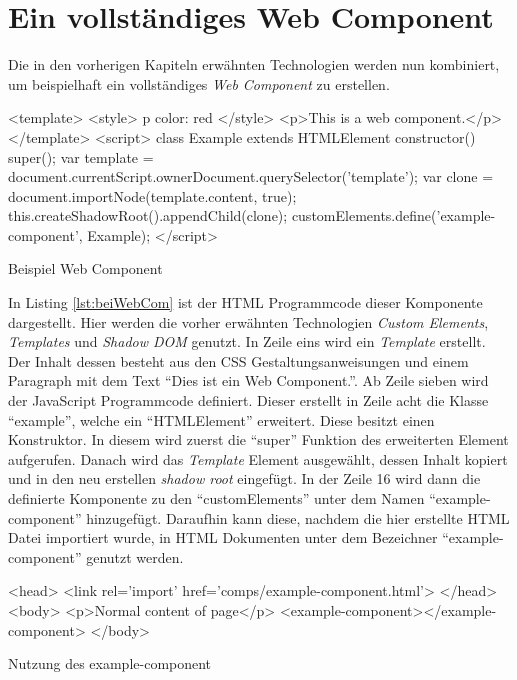 \documentclass[12pt, paper=a4, bibtotoc, toc=listof, headsepline=true]{scrreprt}
\begin{document}
		\section{Ein vollständiges Web Component}
		Die in den vorherigen Kapiteln erwähnten Technologien werden nun kombiniert, um beispielhaft ein vollständiges \emph{Web Component} zu erstellen. 		\begin{listing}
			\begin{HTMLcode*}{}
<template>
   <style>
      p {color: red}
   </style>
   <p>This is a web component.</p>
</template>
<script>
   class Example extends HTMLElement {
      constructor() {
         super();
         var template = document.currentScript.ownerDocument.querySelector('template');
         var clone = document.importNode(template.content, true);
         this.createShadowRoot().appendChild(clone);
      }
   }
customElements.define('example-component', Example);
</script>
			\end{HTMLcode*}
			\caption{Beispiel Web Component}
			\label{lst:beiWebCom}
		\end{listing}
		In Listing \ref{lst:beiWebCom} ist der \ac{HTML} Programmcode dieser Komponente dargestellt. Hier werden die vorher erwähnten Technologien \emph{Custom Elements}, \emph{Templates} und \emph{Shadow DOM} genutzt. In Zeile eins wird ein \emph{Template} erstellt. Der Inhalt dessen besteht aus den \ac{CSS} Gestaltungsanweisungen und einem Paragraph mit dem Text \enquote{Dies ist ein Web Component.}. Ab Zeile sieben wird der JavaScript Programmcode definiert. Dieser erstellt in Zeile acht die Klasse \enquote{example}, welche ein \enquote{HTMLElement} erweitert. Diese besitzt einen Konstruktor. In diesem wird zuerst die \enquote{super} Funktion des erweiterten Element aufgerufen. Danach wird das \emph{Template} Element ausgewählt, dessen Inhalt kopiert und in den neu erstellen \emph{shadow root} eingefügt. In der Zeile 16 wird dann die definierte Komponente zu den \enquote{customElements} unter dem Namen \enquote{example-component} hinzugefügt. Daraufhin kann diese, nachdem die hier erstellte \ac{HTML} Datei importiert wurde, in \ac{HTML} Dokumenten unter dem Bezeichner \enquote{example-component} genutzt werden.
\begin{listing}[H]
	\begin{HTMLcode*}{}
<head>
   <link rel='import' href='comps/example-component.html'>
</head>
<body>
   <p>Normal content of page</p>
   <example-component></example-component>
</body>
	\end{HTMLcode*}
	\caption{Nutzung des example-component}
	\label{lst:nutExaCom}
\end{listing}
\end{document}
